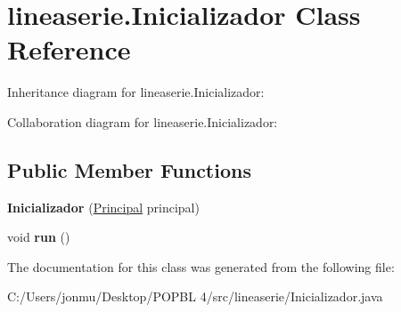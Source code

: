 \hypertarget{classlineaserie_1_1_inicializador}{}\section{lineaserie.\+Inicializador Class Reference}
\label{classlineaserie_1_1_inicializador}


Inheritance diagram for lineaserie.\+Inicializador\+:


Collaboration diagram for lineaserie.\+Inicializador\+:
\subsection*{Public Member Functions}
\begin{DoxyCompactItemize}
\item 
\mbox{\label{classlineaserie_1_1_inicializador_a86958a2a419199116654e4f259e86a66}} 
{\bfseries Inicializador} (\mbox{\hyperlink{classvistas_1_1_principal}{Principal}} principal)
\item 
\mbox{\label{classlineaserie_1_1_inicializador_a8163b9059ff9417835aae96eddd8464a}} 
void {\bfseries run} ()
\end{DoxyCompactItemize}


The documentation for this class was generated from the following file\+:\begin{DoxyCompactItemize}
\item 
C\+:/\+Users/jonmu/\+Desktop/\+P\+O\+P\+B\+L 4/src/lineaserie/Inicializador.\+java\end{DoxyCompactItemize}
